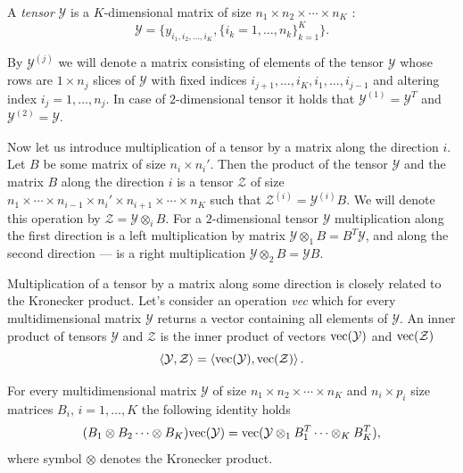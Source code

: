 A {\em tensor} $\mathcal{Y}$ is a $K$-dimensional matrix of size $n_1 \times n_2 \times \cdots \times n_K$
\citep{kolda09tensordecompositions}:
\begin{equation}
  \label{eq:tensor}
  \mathcal{Y} = \{ y_{i_1, i_2, \ldots, i_K}, \{i_k = 1, \ldots, n_k \}_{k = 1}^K \}.
\end{equation}

By $\mathcal{Y}^{(j)}$ we will denote a matrix consisting of elements of the tensor $\mathcal{Y}$
whose rows are $1 \times n_j$ slices of $\mathcal{Y}$ with fixed indices
$i_{j + 1}, \ldots, i_K, i_1, \ldots, i_{j - 1}$ and altering index $i_j = 1, \ldots, n_j$.
In case of $2$-dimensional tensor it holds that
${\mathcal{Y}^{(1)} = \mathcal{Y}^T}$ and $\mathcal{Y}^{(2)} = \mathcal{Y}$.

Now let us introduce multiplication of a tensor by a matrix along the direction $i$.
Let $B$ be some matrix of size $n_i \times n_i'$.
Then the product of the tensor $\mathcal{Y}$ and the matrix $B$ along the direction $i$
is a tensor $\mathcal{Z}$ of size $n_1 \times \cdots \times n_{i - 1} \times n_i' \times n_{i + 1} \times \cdots \times n_K$
such that $\mathcal{Z}^{(i)} = \mathcal{Y}^{(i)}B$.
We will denote this operation by $\mathcal{Z} = \mathcal{Y} \otimes_i B$.
For a $2$-dimensional tensor $\mathcal{Y}$ multiplication along the first direction is a left multiplication
by matrix $\mathcal{Y} \otimes_1 B = B^T \mathcal{Y}$,
and along the second direction --- is a right multiplication $\mathcal{Y} \otimes_2 B = \mathcal{Y} B$.

Multiplication of a tensor by a matrix along some direction is closely related to the Kronecker product.
Let's consider an operation {\em vec} which for every multidimensional matrix $\mathcal{Y}$
returns a vector containing all elements of $\mathcal{Y}$.
An inner product of tensors $\mathcal{Y}$ and $\mathcal{Z}$ is the inner product of vectors
${\rm vec}(\mathcal{Y})$ and ${\rm vec}(\mathcal{Z})$
\[
\left < \mathcal{Y}, \mathcal{Z}\right > = \left < {\rm vec}(\mathcal{Y}), {\rm vec}(\mathcal{Z}) \right >.
\]

For every multidimensional matrix $\mathcal{Y}$ of size $n_1 \times n_2 \times \cdots \times n_K$
and $n_i \times p_i$ size matrices $B_i$, $i = 1, \ldots, K$ the following identity holds \citep{loan2000kronecker}
\begin{equation}
  \label{eq:kronecker_product}
    (B_1 \otimes B_2 \cdots \otimes B_K) {\rm vec}(\mathcal{Y}) =
    {\rm vec} (\mathcal{Y} \otimes_1 B_1^T \cdots \otimes_K B_K^T),
\end{equation}
where symbol $\otimes$ denotes the Kronecker product.


